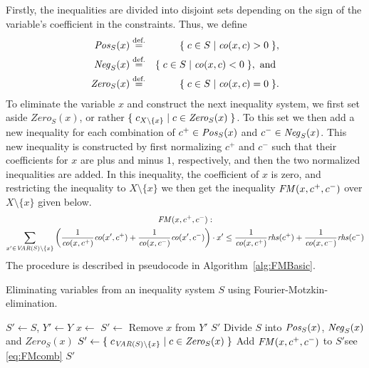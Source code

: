 Firstly, the inequalities are divided into disjoint sets depending on the sign of the variable's coefficient in the constraints. Thus, we define
\begin{eqnarray*}
\mathit{Pos}_S(x) &\overset{\text{def.}}=& \{\;{c\in S}\;|\;{\mathit{co}(x,c) > 0}\;\},\\
\mathit{Neg}_S(x) &\overset{\text{def.}}=& \{\;{c\in S}\;|\;{\mathit{co}(x,c) < 0}\;\}, \text{ and }\\ 
\mathit{Zero}_S(x) &\overset{\text{def.}}=& \{\;{c\in S}\;|\;{\mathit{co}(x,c) = 0}\;\}.
\end{eqnarray*}
To eliminate the variable $x$ and construct the next inequality system, we first set aside $\mathit{Zero}_S(x)$, or rather $\{\;{c_{X\setminus\{x\}}}\;|\;{c\in \mathit{Zero}_S(x)}\;\}$. To this set we then add a new inequality for each combination of $c^+\in\mathit{Pos}_S(x)$ and $c^-\in\mathit{Neg}_S(x)$. This new inequality is constructed by first normalizing $c^+$ and $c^-$ such that their coefficients for $x$ are plus and minus $1$, respectively, and then the two normalized inequalities are added. In this inequality, the coefficient of $x$ is zero, and restricting the inequality to $X\setminus\{x\}$ we then get the inequality $\mathit{FM}(x,c^+, c^-)$ over $X\setminus\{x\}$ given below. 
\begin{multline}
\label{eq:FMcomb}
\mathit{FM}(x,c^+, c^-):\\ 
\sum_{x'\in \mathit{VAR}(S)\setminus\{x\}} \left(\frac{1}{\mathit{co}(x,c^+)}\mathit{co}(x',c^+) + \frac{1}{\mathit{co}(x,c^-)}\mathit{co}(x',c^-)\right)\cdot x'
\leq \frac{1}{\mathit{co}(x,c^+)}\mathit{rhs}(c^+) + \frac{1}{\mathit{co}(x,c^-)}\mathit{rhs}(c^-)
\end{multline}
The procedure is described in pseudocode in Algorithm~\ref{alg:FMBasic}.
\begin{algorithm}[htbp]
\caption{Eliminating variables from an inequality system $S$ using Fourier-Motzkin-elimination.}\label{alg:FMBasic}
\begin{algorithmic}[1]
	\State  $S'\gets S$, $Y'\gets Y$
		\State $x\gets$ 
		\State $S' \gets$ 
		\State Remove $x$ from $Y'$
	\EndWhile
	\State \Return $S'$
\EndFunction
\Statex
{}
\State Divide $S$ into $\mathit{Pos}_S(x)$, $\mathit{Neg}_S(x)$ and $\mathit{Zero}_S(x)$
\State $S'\gets \{\;{c_{\mathit{VAR}(S)\setminus\{x\}}}\;|\;{c\in\mathit{Zero}_S(x)}\;\}$ 
		\State Add $\mathit{FM}(x,c^+, c^-)$ to $S'$\Comment see \eqref{eq:FMcomb}
	\EndFor
\EndFor
\State \Return $S'$
\EndFunction
\end{algorithmic}
\end{algorithm}


